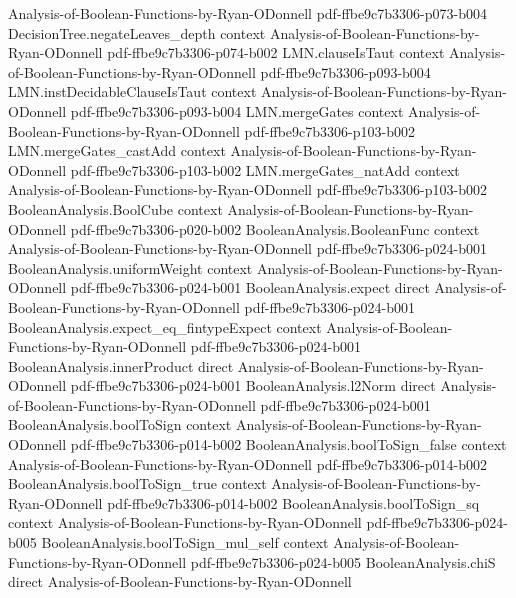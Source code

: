 \begin{theorem}
  {Analysis-of-Boolean-Functions-by-Ryan-ODonnell}
  {pdf-ffbe9c7b3306-p073-b004}
\proofstep
  {DecisionTree.negateLeaves_depth}
  {context}
  {Analysis-of-Boolean-Functions-by-Ryan-ODonnell}
  {pdf-ffbe9c7b3306-p074-b002}
\proofstep
  {LMN.clauseIsTaut}
  {context}
  {Analysis-of-Boolean-Functions-by-Ryan-ODonnell}
  {pdf-ffbe9c7b3306-p093-b004}
\proofstep
  {LMN.instDecidableClauseIsTaut}
  {context}
  {Analysis-of-Boolean-Functions-by-Ryan-ODonnell}
  {pdf-ffbe9c7b3306-p093-b004}
\proofstep
  {LMN.mergeGates}
  {context}
  {Analysis-of-Boolean-Functions-by-Ryan-ODonnell}
  {pdf-ffbe9c7b3306-p103-b002}
\proofstep
  {LMN.mergeGates_castAdd}
  {context}
  {Analysis-of-Boolean-Functions-by-Ryan-ODonnell}
  {pdf-ffbe9c7b3306-p103-b002}
\proofstep
  {LMN.mergeGates_natAdd}
  {context}
  {Analysis-of-Boolean-Functions-by-Ryan-ODonnell}
  {pdf-ffbe9c7b3306-p103-b002}
\proofstep
  {BooleanAnalysis.BoolCube}
  {context}
  {Analysis-of-Boolean-Functions-by-Ryan-ODonnell}
  {pdf-ffbe9c7b3306-p020-b002}
\proofstep
  {BooleanAnalysis.BooleanFunc}
  {context}
  {Analysis-of-Boolean-Functions-by-Ryan-ODonnell}
  {pdf-ffbe9c7b3306-p024-b001}
\proofstep
  {BooleanAnalysis.uniformWeight}
  {context}
  {Analysis-of-Boolean-Functions-by-Ryan-ODonnell}
  {pdf-ffbe9c7b3306-p024-b001}
\proofstep
  {BooleanAnalysis.expect}
  {direct}
  {Analysis-of-Boolean-Functions-by-Ryan-ODonnell}
  {pdf-ffbe9c7b3306-p024-b001}
\proofstep
  {BooleanAnalysis.expect_eq_fintypeExpect}
  {context}
  {Analysis-of-Boolean-Functions-by-Ryan-ODonnell}
  {pdf-ffbe9c7b3306-p024-b001}
\proofstep
  {BooleanAnalysis.innerProduct}
  {direct}
  {Analysis-of-Boolean-Functions-by-Ryan-ODonnell}
  {pdf-ffbe9c7b3306-p024-b001}
\proofstep
  {BooleanAnalysis.l2Norm}
  {direct}
  {Analysis-of-Boolean-Functions-by-Ryan-ODonnell}
  {pdf-ffbe9c7b3306-p024-b001}
\proofstep
  {BooleanAnalysis.boolToSign}
  {context}
  {Analysis-of-Boolean-Functions-by-Ryan-ODonnell}
  {pdf-ffbe9c7b3306-p014-b002}
\proofstep
  {BooleanAnalysis.boolToSign_false}
  {context}
  {Analysis-of-Boolean-Functions-by-Ryan-ODonnell}
  {pdf-ffbe9c7b3306-p014-b002}
\proofstep
  {BooleanAnalysis.boolToSign_true}
  {context}
  {Analysis-of-Boolean-Functions-by-Ryan-ODonnell}
  {pdf-ffbe9c7b3306-p014-b002}
\proofstep
  {BooleanAnalysis.boolToSign_sq}
  {context}
  {Analysis-of-Boolean-Functions-by-Ryan-ODonnell}
  {pdf-ffbe9c7b3306-p024-b005}
\proofstep
  {BooleanAnalysis.boolToSign_mul_self}
  {context}
  {Analysis-of-Boolean-Functions-by-Ryan-ODonnell}
  {pdf-ffbe9c7b3306-p024-b005}
\proofstep
  {BooleanAnalysis.chiS}
  {direct}
  {Analysis-of-Boolean-Functions-by-Ryan-ODonnell}

\end{theorem}
